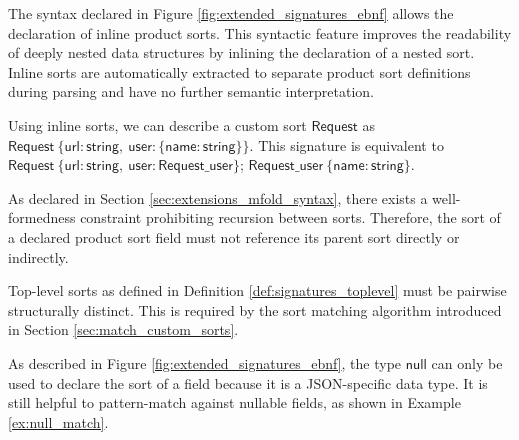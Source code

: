 \begin{definition}
	The syntax declared in Figure \ref{fig:extended_signatures_ebnf} allows the declaration of inline product sorts. This syntactic feature improves the readability of deeply nested data structures by inlining the declaration of a nested sort. Inline sorts are automatically extracted to separate product sort definitions during parsing and have no further semantic interpretation.
\end{definition}
\begin{example}
	Using inline sorts, we can describe a custom sort $\mathsf{Request}$ as $\mathsf{Request\ \{ url:string,\ user:\{ name:string \} \}}$. This signature is equivalent to $\mathsf{Request\ \{ url:string,\ user:Request\_user \}}$; $\mathsf{Request\_user\ \{ name: string \}}$.
\end{example}

\begin{rule2}
	As declared in Section \ref{sec:extensions_mfold_syntax}, there exists a well-formedness constraint prohibiting recursion between sorts. Therefore, the sort of a declared product sort field must not reference its parent sort directly or indirectly.
\end{rule2}

\begin{rule2}
	\label{rule:unique_top_level}
	Top-level sorts as defined in Definition \ref{def:signatures_toplevel} must be pairwise structurally distinct. This is required by the sort matching algorithm introduced in Section \ref{sec:match_custom_sorts}.
\end{rule2}

As described in Figure \ref{fig:extended_signatures_ebnf}, the type $\mathsf{null}$ can only be used to declare the sort of a field because it is a JSON-specific data type. It is still helpful to pattern-match against nullable fields, as shown in Example \ref{ex:null_match}.

